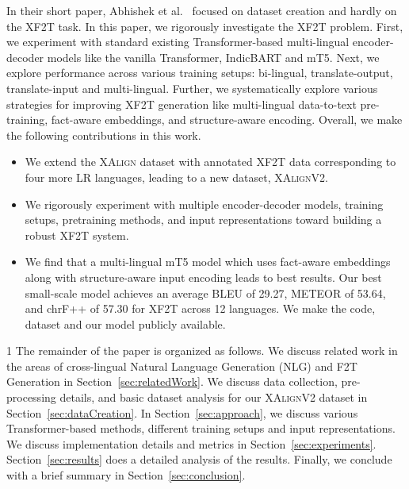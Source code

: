 \documentclass[runningheads]{llncs}
\newcommand{\data}{\textsc{XAlignV2}}
\def\arxiv{1}
\begin{document}
In their short paper, Abhishek et al.~\cite{abhishek2022xalign} focused on dataset creation and hardly on the XF2T task. In this paper, we rigorously investigate the XF2T problem. First, we experiment with standard existing Transformer-based multi-lingual encoder-decoder models like the vanilla Transformer, IndicBART and mT5. Next, we explore performance across various training setups: bi-lingual, translate-output, translate-input and multi-lingual. Further, we systematically explore various strategies for improving XF2T generation like multi-lingual data-to-text pre-training, fact-aware embeddings, and structure-aware encoding. Overall, we make the following contributions in this work. 
\begin{itemize}
\itemsep=0pt
\topsep=0pt
    \item We extend the \textsc{XAlign} dataset with annotated XF2T data corresponding to four more LR languages, leading to a new dataset, \data{}.
    \item We rigorously experiment with multiple encoder-decoder models, training setups, pretraining methods, and input representations toward building a robust XF2T system.
    \item We find that a multi-lingual mT5 model which uses fact-aware embeddings along with structure-aware input encoding leads to best results. Our best small-scale model achieves an average BLEU of 29.27, METEOR of 53.64, and chrF++ of 57.30 for XF2T across 12 languages. We make the code, dataset and our model publicly available.
\end{itemize}











\if\arxiv1
The remainder of the paper is organized as follows. We discuss related work in the areas of cross-lingual Natural Language Generation (NLG) and F2T Generation in Section~\ref{sec:relatedWork}. We discuss data collection,  pre-processing details, and basic dataset analysis for our \data{} dataset in Section~\ref{sec:dataCreation}. In Section~\ref{sec:approach}, we discuss various Transformer-based methods, different training setups and input representations. We discuss implementation details and metrics in Section~\ref{sec:experiments}. Section~\ref{sec:results} does a detailed analysis of the results. Finally, we conclude with a brief summary in Section~\ref{sec:conclusion}.
\fi
\end{document}
